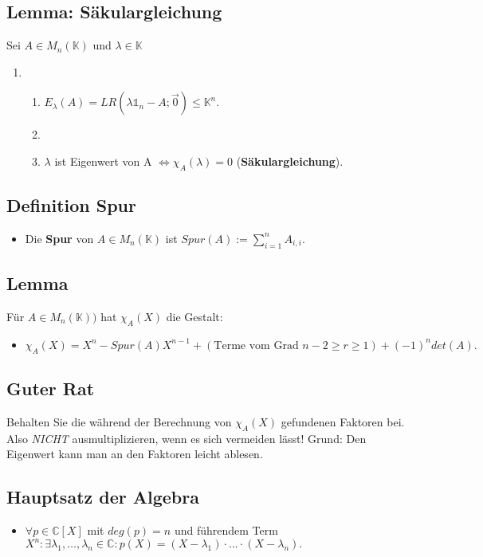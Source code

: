 \documentclass[titlepage]{article}
\newcommand{\K}{\mathbb{K}}
\newcommand{\C}{\mathbb{C}}
\newcommand{\1}{\mathbb{1}}
\newcommand{\0}{\mathbb{0}}
\begin{document}
			\subsection{Lemma: Säkulargleichung}
				Sei $A\in M_n(\K)$ und $\lambda\in\K$
				\begin{enumerate}
					\item []
					\begin{enumerate}
						\item $E_{\lambda}(A)=LR(\lambda\1_n-A;\vec{0})\le\K^n.$
						\item []
						\item $\lambda$ ist Eigenwert von A $\Longleftrightarrow\chi_A(\lambda)=0$ (\textbf{Säkulargleichung}).
					\end{enumerate}
				\end{enumerate}
			\subsection{Definition Spur}
				\begin{itemize}
					\item Die \textbf{Spur} von $A\in M_n(\K)$ ist $Spur(A):=\sum^n_{i=1}A_{i,i}.$
				\end{itemize}
			\subsection{Lemma}
				Für $A\in M_n(\K))$ hat $\chi_A(X)$ die Gestalt:
				\begin{itemize}
					\item $\chi_A(X)=X^n-Spur(A)X^{n-1}+(\text{Terme vom Grad } n-2\ge r\ge1)+(-1)^ndet(A).$
				\end{itemize}
			\subsection{Guter Rat}
				Behalten Sie die während der Berechnung von $\chi_A(X)$ gefundenen Faktoren bei. Also \textit{NICHT} ausmultiplizieren, wenn es sich vermeiden lässt! Grund: Den Eigenwert kann man an den Faktoren leicht ablesen.
			\subsection{Hauptsatz der Algebra}
				\begin{itemize}
					\item $\forall p\in\C[X]$ mit $deg(p)=n$ und führendem Term $X^n:\exists\lambda_1,\dots,\lambda_n\in\C:p(X)=(X-\lambda_1)\cdot...\cdot(X-\lambda_n).$
				\end{itemize}
\end{document}
